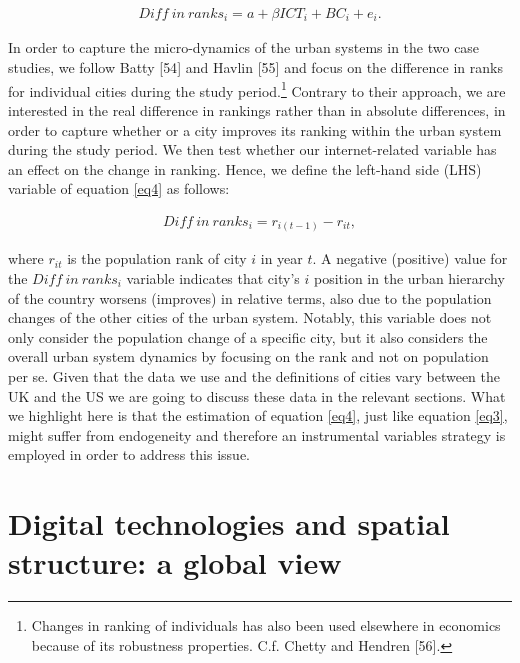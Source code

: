 \documentclass[10pt,letterpaper]{article}
\begin{document}
\begin{align}
Diff\:in\:ranks_{i} = a + \beta ICT_{i} + B C_{i} + e_{i}.\label{eq4}
\end{align}

In order to capture the micro-dynamics of the urban systems in the two
case studies, we follow Batty {[}54{]} and Havlin {[}55{]} and focus on
the difference in ranks for individual cities during the study
period.\footnote{Changes in ranking of individuals has also been used
  elsewhere in economics because of its robustness properties. C.f.
  Chetty and Hendren {[}56{]}.} Contrary to their approach, we are
interested in the real difference in rankings rather than in absolute
differences, in order to capture whether or a city improves its ranking
within the urban system during the study period. We then test whether
our internet-related variable has an effect on the change in ranking.
Hence, we define the left-hand side (LHS) variable of equation \ref{eq4}
as follows:

\begin{align}
Diff\:in\:ranks_{i} = r_{i(t-1)} - r_{it},\label{eq5}
\end{align}

\noindent where \(r_{it}\) is the population rank of city \(i\) in year
\(t\). A negative (positive) value for the \(Diff\:in\:ranks_{i}\)
variable indicates that city's \(i\) position in the urban hierarchy of
the country worsens (improves) in relative terms, also due to the
population changes of the other cities of the urban system. Notably,
this variable does not only consider the population change of a specific
city, but it also considers the overall urban system dynamics by
focusing on the rank and not on population per se. Given that the data
we use and the definitions of cities vary between the UK and the US we
are going to discuss these data in the relevant sections. What we
highlight here is that the estimation of equation \ref{eq4}, just like
equation \ref{eq3}, might suffer from endogeneity and therefore an
instrumental variables strategy is employed in order to address this
issue.

\hypertarget{sec4}{%
\section{Digital technologies and spatial structure: a global
view}\label{sec4}}
\end{document}
